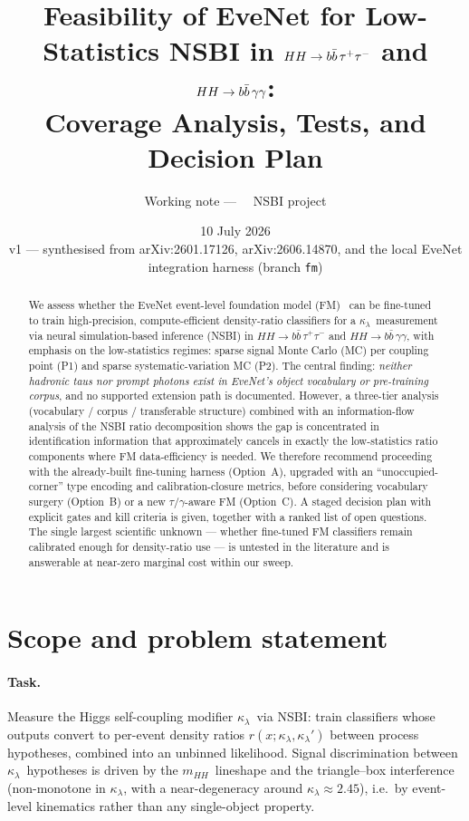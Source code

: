 \documentclass[11pt]{article}
\title{Feasibility of EveNet for Low-Statistics NSBI in
$HH\to\bbtt$ and $HH\to\bbgg$:\\
Coverage Analysis, Tests, and Decision Plan}
\author{Working note --- \bbtt\ \kl\ NSBI project}
\date{10 July 2026 \\[2pt] \small v1 --- synthesised from arXiv:2601.17126, arXiv:2606.14870,
and the local EveNet integration harness (branch \texttt{fm})}
\newcommand{\kl}{\ensuremath{\kappa_\lambda}}
\newcommand{\bbtt}{\ensuremath{b\bar b\,\tau^+\tau^-}}
\newcommand{\bbgg}{\ensuremath{b\bar b\,\gamma\gamma}}
\newcommand{\mhh}{\ensuremath{m_{HH}}}
\begin{document}
\maketitle

\begin{abstract}
\noindent
We assess whether the EveNet event-level foundation model (FM)~\cite{Hsu:2026evenet}
can be fine-tuned to train high-precision, compute-efficient density-ratio
classifiers for a \kl\ measurement via neural simulation-based inference (NSBI)
in $HH\to\bbtt$ and $HH\to\bbgg$, with emphasis on the low-statistics regimes:
sparse signal Monte Carlo (MC) per coupling point (P1) and sparse
systematic-variation MC (P2). The central finding: \emph{neither hadronic taus
nor prompt photons exist in EveNet's object vocabulary or pre-training corpus},
and no supported extension path is documented. However, a three-tier analysis
(vocabulary / corpus / transferable structure) combined with an
information-flow analysis of the NSBI ratio decomposition shows the gap is
concentrated in identification information that approximately cancels in
exactly the low-statistics ratio components where FM data-efficiency is
needed. We therefore recommend proceeding with the already-built fine-tuning
harness (Option~A), upgraded with an ``unoccupied-corner'' type encoding and
calibration-closure metrics, before considering vocabulary surgery
(Option~B) or a new $\tau/\gamma$-aware FM (Option~C). A staged decision plan
with explicit gates and kill criteria is given, together with a ranked list of
open questions. The single largest scientific unknown --- whether fine-tuned FM
classifiers remain calibrated enough for density-ratio use --- is untested in
the literature and is answerable at near-zero marginal cost within our sweep.
\end{abstract}

\tableofcontents

\section{Scope and problem statement}
\label{sec:scope}

\paragraph{Task.} Measure the Higgs self-coupling modifier \kl\ via NSBI:
train classifiers whose outputs convert to per-event density ratios
$r(x;\kl,\kl')$ between process hypotheses, combined into an unbinned
likelihood. Signal discrimination between \kl\ hypotheses is driven by the
\mhh\ lineshape and the triangle--box interference (non-monotone in \kl,
with a near-degeneracy around $\kl\approx 2.45$), i.e.\ by event-level
kinematics rather than any single-object property.
\end{document}
